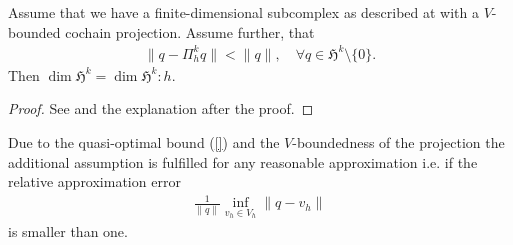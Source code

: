 \documentclass[../master_thesis.tex]{subfiles}
\begin{document}
\begin{theorem}
    Assume that we have a finite-dimensional subcomplex as described at 
    with a $V$-bounded cochain projection. Assume further, that 
    \begin{align}
        \lVert q - \Pi_h^k q \rVert < \lVert q \rVert, \quad \forall q \in \mathfrak{H}^k\setminus \{0\}.
        \label{eq:assumption_same_dimension}
    \end{align}
    Then $\dim \mathfrak{H}^k = \dim \mathfrak{H}^k:h$.
\end{theorem}
\begin{proof}
    See \cite[Thm\,5.1]{arnold} and the explanation after the proof.
\end{proof}
Due to the quasi-optimal bound (\ref{}) and the $V$-boundedness of the projection 
the additional assumption 
is fulfilled for any reasonable approximation i.e. if the relative approximation error 
\begin{align*}
    \frac{1}{\lVert q \rVert} \inf_{v_h \in V_h} \lVert q - v_h \rVert
\end{align*}
is smaller than one.
\end{document}
